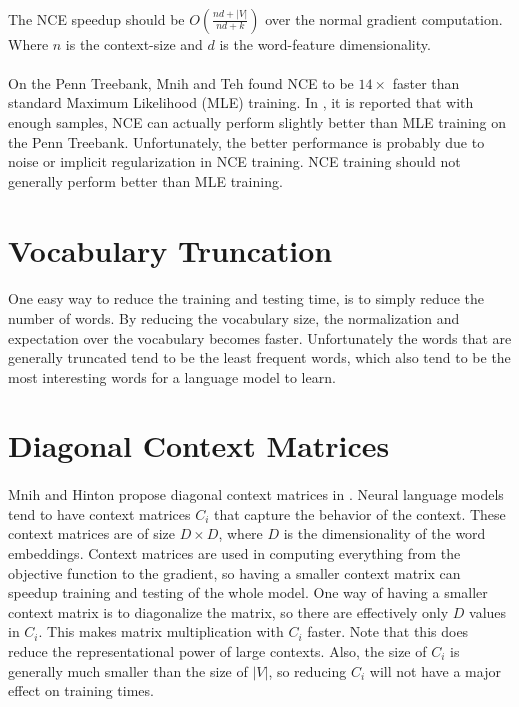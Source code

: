 \paragraph{}
The NCE speedup should be $O \left(\frac{nd + |V|} {nd+ k} \right)$ over the normal gradient computation. Where $n$ is the context-size and $d$ is the word-feature dimensionality.
\paragraph{}
On the Penn Treebank, Mnih and Teh found NCE to be $14\times$ faster than standard Maximum Likelihood (MLE)  training. In \cite{MnihTeh2012}, it is reported that with enough samples, NCE can actually perform slightly better than MLE training on the Penn Treebank. Unfortunately, the better performance is probably due to noise or implicit regularization in NCE training. NCE training should not generally perform better than MLE training.


\section{Vocabulary Truncation}
\paragraph{}
One easy way to reduce the training and testing time, is to simply reduce the number of words. By reducing the vocabulary size, the normalization and expectation over the vocabulary becomes faster. Unfortunately the words that are generally truncated tend to be the least frequent words, which also tend to be the most interesting words for a language model to learn. 
\section{Diagonal Context Matrices}
\paragraph{}
Mnih and Hinton propose diagonal context matrices in \cite{MnihHinton2009}. Neural language models tend to have context matrices $C_i$ that capture the behavior of the context. These context matrices are of size $D \times D$, where $D$ is the dimensionality of the word embeddings. Context matrices are used in computing everything from the objective function to the gradient, so having a smaller context matrix can speedup training and testing of the whole model. One way of having a smaller context matrix is to diagonalize the matrix, so there are effectively only $D$ values in $C_i$. This makes matrix multiplication with $C_i$ faster. Note that this does reduce the representational power of large contexts. Also, the size of $C_i$ is generally much smaller than the size of $|V|$, so reducing $C_i$ will not have a major effect on training times.

